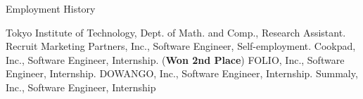 \begin{rubric}{Employment History}

  \entry*[2020.11-2023.3] Tokyo Institute of Technology, Dept. of Math. and Comp., Research Assistant.
  \entry*[2018.6–2019.2] Recruit Marketing Partners, Inc., Software Engineer, Self-employment.
  \entry*[2018.8] Cookpad, Inc., Software Engineer, Internship. (\textbf{Won 2nd Place})
  \entry*[2017.4–2018.3] FOLIO, Inc., Software Engineer, Internship.
  \entry*[2016.8–2017.3] DOWANGO, Inc., Software Engineer, Internship.
  \entry*[2016.1–2016.6] Summaly, Inc., Software Engineer, Internship
%
\end{rubric}
